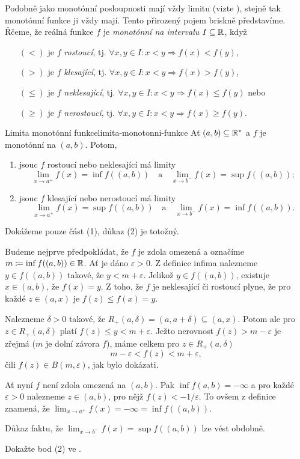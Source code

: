 Podobně jako monotónní posloupnosti mají vždy limitu (vizte
), stejně tak mono\-tónní funkce
ji vždy mají. Tento přirozený pojem briskně představíme. Řčeme, že reálná funkce
$f$ je \emph{monotónní na intervalu} $I \subseteq \mathbb{R}$, když
\begin{itemize}
 \item[$(<)$] je $f$ \emph{rostoucí}, tj. $\forall x,y \in I: x<y \Rightarrow
  f(x)<f(y)$,
 \item[$(>)$] je $f$ \emph{klesající}, tj. $ \forall x,y \in I: x < y
  \Rightarrow f(x) > f(y)$,
 \item[$(\leq)$] je $f$ \emph{neklesající}, tj. $ \forall x,y \in I:x<y
  \Rightarrow f(x) \leq f(y)$ nebo
 \item[$(\geq)$] je $f$ \emph{nerostoucí}, tj. $ \forall x,y \in I:x<y
  \Rightarrow f(x) \geq f(y)$.
\end{itemize}
\begin{theorem}{Limita monotónní funkce}{limita-monotonni-funkce}
 Ať $(a,b) \subseteq \mathbb{R}^{*}$ a $f$ je monotónní na $(a,b)$. Potom,
 \begin{enumerate}
  \item jsouc $f$ rostoucí nebo neklesající má limity
  \[
   \lim_{x \to a^{+}} f(x) = \inf f((a,b)) \quad \text{a} \quad \lim_{x \to
   b^{-}} f(x) = \sup f((a,b));
  \]
 \item jsouc $f$ klesající nebo nerostoucí má limity
  \[
   \lim_{x \to a^{+}} f(x) = \sup f((a,b)) \quad \text{a} \quad \lim_{x \to
   b^{-}} f(x) = \inf f((a,b)).
  \]
 \end{enumerate}
\end{theorem}
\begin{thmproof}
 Dokážeme pouze část (1), důkaz (2) je totožný.

 Budeme nejprve předpokládat, že $f$ je zdola omezená a označíme $m \coloneqq
 \inf f((a,b)) \in \mathbb{R}$. Ať je dáno $\varepsilon>0$. Z definice infima nalezneme
 $y \in f((a,b))$ takové, že $y < m + \varepsilon$. Jelikož $y \in f((a,b))$,
 existuje $x \in (a,b)$, že $f(x) = y$. Z toho, že $f$ je neklesající či
 rostoucí plyne, že pro každé $z \in (a,x)$ je $f(z) \leq f(x) = y$.

 Nalezneme $\delta>0$ takové, že $R_+(a,\delta) = (a,a+\delta) \subseteq (a,x)$.
 Potom ale pro $z \in R_+(a,\delta)$ platí $f(z) \leq y < m+\varepsilon$. Ježto
 nerovnost $f(z) > m-\varepsilon$ je zřejmá ($m$ je dolní závora $f$), máme
 celkem pro $z \in R_+(a,\delta)$
 \[
  m -\varepsilon < f(z) < m + \varepsilon,
 \]
 čili $f(z) \in B(m,\varepsilon)$, jak bylo dokázati.

 Ať nyní $f$ není zdola omezená na $(a,b)$. Pak $\inf f(a,b) = -\infty$ a pro
 každé $\varepsilon>0$ nalezneme $z \in (a,b)$, pro nějž $f(z) < -1 /
 \varepsilon$. To ovšem z definice znamená, že $\lim_{x \to a^{+}} f(x) =
 -\infty = \inf f((a,b))$.

 Důkaz faktu, že $\lim_{x \to b^{-}} f(x) = \sup f((a,b))$ lze vést obdobně.
\end{thmproof}

\begin{exercise}{}{}
 Dokažte bod (2) ve .
\end{exercise}


